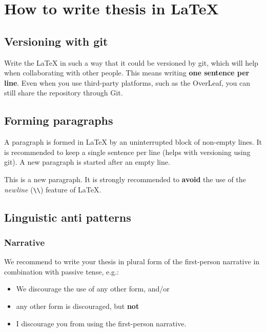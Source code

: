 
\chapter{How to write thesis in LaTeX\label{chap:how_to}}

\section{Versioning with git}

Write the LaTeX in such a way that it could be versioned by git, which will help when collaborating with other people.
This means writing \textbf{one sentence per line}.
Even when you use third-party platforms, such as the OverLeaf, you can still share the repository through Git.

\section{Forming paragraphs}

A paragraph is formed in LaTeX by an uninterrupted block of non-empty lines.
It is recommended to keep a single sentence per line (helps with versioning using git).
A new paragraph is started after an empty line.

This is a new paragraph. It is strongly recommended to \textbf{avoid} the use of the \emph{newline} (\texttt{\textbackslash\textbackslash}) feature of LaTeX.

\section{Linguistic anti patterns}

\subsection{Narrative}

We recommend to write your thesis in plural form of the first-person narrative in combination with passive tense, e.g.:
\begin{itemize}
  \item We discourage the use of any other form, and/or
  \item any other form is discouraged, but \textbf{not}
  \item {\color{red} I discourage you from using the first-person narrative}.
\end{itemize}

